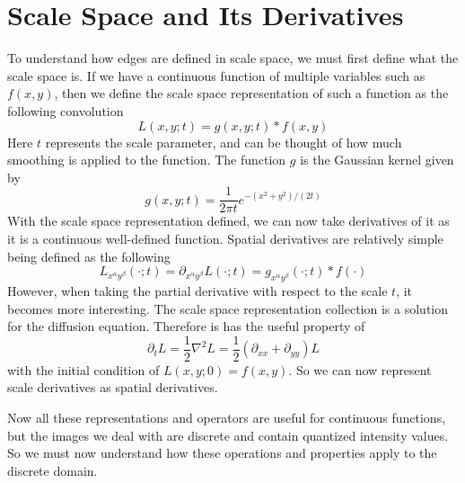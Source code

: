 \documentclass{article}
\begin{document}
\section{Scale Space and Its Derivatives}
To understand how edges are defined in scale space, we must first define what the scale space is.
If we have a continuous function of multiple variables such as $f(x,y)$, then we define the scale space representation of such a function as the following convolution
\begin{equation}
  L(x,y;t) = g(x,y;t) * f(x,y)
\end{equation}
Here $t$ represents the scale parameter, and can be thought of how much smoothing is applied to the function. The function $g$ is the Gaussian kernel given by
\begin{equation}
  g(x,y;t) = \frac{1}{2 \pi t}e^{-(x^2+y^2)/(2t)}
\end{equation}
With the scale space representation defined, we can now take derivatives of it as it is a continuous well-defined function.
Spatial derivatives are relatively simple being defined as the following
\begin{equation}
  L_{x^{\alpha}y^{\beta}}(\cdot;t) = \partial_{x^{\alpha}y^{\beta}}L(\cdot;t) = g_{x^{\alpha}y^{\beta}}(\cdot;t) * f(\cdot)
\end{equation}
However, when taking the partial derivative with respect to the scale $t$, it becomes more interesting.
The scale space representation collection is a solution for the diffusion equation. Therefore is has the useful property of \cite{Lindeberg1993}
\begin{equation}
  \partial_t L = \frac{1}{2} \nabla^2 L = \frac{1}{2} (\partial_{xx} + \partial_{yy})L
\end{equation}
with the initial condition of $L(x,y;0) = f(x,y)$.
So we can now represent scale derivatives as spatial derivatives. 

Now all these representations and operators are useful for continuous functions, but the images we deal with are discrete and contain quantized intensity values.
So we must now understand how these operations and properties apply to the discrete domain.
\end{document}
